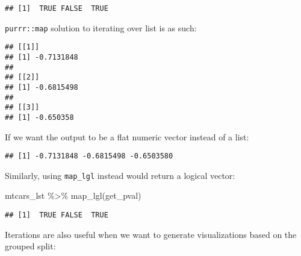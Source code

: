 \documentclass[
]{book}
\newenvironment{Shaded}{\begin{snugshade}}{\end{snugshade}}
\newcommand{\FunctionTok}[1]{\textcolor[rgb]{0.00,0.00,0.00}{#1}}
\newcommand{\NormalTok}[1]{#1}
\newcommand{\SpecialCharTok}[1]{\textcolor[rgb]{0.00,0.00,0.00}{#1}}
\begin{document}
\begin{verbatim}
## [1]  TRUE FALSE  TRUE
\end{verbatim}

\texttt{purrr::map} solution to iterating over list is as such:

\begin{Shaded}
\end{Shaded}

\begin{verbatim}
## [[1]]
## [1] -0.7131848
## 
## [[2]]
## [1] -0.6815498
## 
## [[3]]
## [1] -0.650358
\end{verbatim}

If we want the output to be a flat numeric vector instead of a list:

\begin{Shaded}
\end{Shaded}

\begin{verbatim}
## [1] -0.7131848 -0.6815498 -0.6503580
\end{verbatim}

Similarly, using \texttt{map\_lgl} instead would return a logical vector:

\begin{Shaded}
\begin{Highlighting}[]
\NormalTok{mtcars\_lst }\SpecialCharTok{\%\textgreater{}\%} \FunctionTok{map\_lgl}\NormalTok{(get\_pval)}
\end{Highlighting}
\end{Shaded}

\begin{verbatim}
## [1]  TRUE FALSE  TRUE
\end{verbatim}

Iterations are also useful when we want to generate visualizations based on the grouped split:
\end{document}
